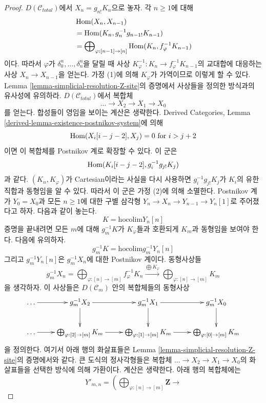 \begin{proof}
$D(\mathcal{C}_{total})$에서 $X_n = g_{n!}K_n$으로 놓자.
각 $n \geq 1$에 대해
$$
\begin{aligned}
&\mathop{\mathrm{Hom}}\nolimits(X_n, X_{n - 1})
\\
&=
\mathop{\mathrm{Hom}}\nolimits(K_n, g_n^{-1}g_{n - 1!}K_{n - 1})
\\
&=
\bigoplus\nolimits_{\varphi : [n - 1] \to [n]}
\mathop{\mathrm{Hom}}\nolimits(K_n, f_\varphi^{-1}K_{n - 1})
\end{aligned}
$$
이다. 따라서 $\varphi$가
$\delta^n_0, \ldots, \delta^n_n$을 달릴 때 사상
$K_\varphi^{-1} : K_n \to f_\varphi^{-1}K_{n - 1}$의
교대합에 대응하는 사상 $X_n \to X_{n - 1}$을 얻는다.
가정 (1)에 의해 $K_\varphi$가 가역이므로 이렇게 할 수 있다.
Lemma \ref{lemma-simplicial-resolution-Z-site}의 증명에서
사상들을 정의한 방식과의 유사성에 유의하라.
$D(\mathcal{C}_{total})$에서 복합체
$$
\ldots \to X_2 \to X_1 \to X_0
$$
를 얻는다. 합성들이 영임을 보이는 계산은 생략한다.
Derived Categories, Lemma
\ref{derived-lemma-existence-postnikov-system}에 의해
$$
\mathop{\mathrm{Hom}}\nolimits(X_i[i - j - 2], X_j) = 0\text{ for }i > j + 2
$$
이면 이 복합체를 Postnikov 계로 확장할 수 있다. 이 군은
$$
\mathop{\mathrm{Hom}}\nolimits(K_i[i - j - 2], g_i^{-1}g_{j!}K_j)
$$
과 같다. $(K_n, K_\varphi)$가 Cartesian이라는 사실을 다시 사용하면
$g_i^{-1}g_{j!}K_j$가 $K_i$의 유한 직합과 동형임을 알 수 있다.
따라서 이 군은 가정 (2)에 의해 소멸한다.
Postnikov 계가 $Y_0 = X_0$과 모든 $n \geq 1$에 대한
구별 삼각형 $Y_n \to X_n \to Y_{n - 1} \to Y_n[1]$로
주어졌다고 하자. 다음과 같이 놓는다.
$$
K = \text{hocolim} Y_n[n]
$$
증명을 끝내려면 모든 $m$에 대해 $g_m^{-1}K$가
$K_\varphi$들과 호환되게 $K_m$과 동형임을 보여야 한다.
다음에 유의하자.
$$
g_m^{-1} K = \text{hocolim} g_m^{-1}Y_n[n]
$$
그리고 $g_m^{-1}Y_n[n]$은 $g_m^{-1}X_n$에 대한 Postnikov 계이다.
동형사상들
$$
g_m^{-1}X_n =
\bigoplus\nolimits_{\varphi : [n] \to [m]} f_\varphi^{-1}K_n
\xrightarrow{\bigoplus K_\varphi}
\bigoplus\nolimits_{\varphi : [n] \to [m]} K_m
$$
을 생각하자. 이 사상들은 $D(\mathcal{C}_m)$ 안의 복합체들의 동형사상
$$
\xymatrix{
\ldots \ar[r] &
g_m^{-1}X_2 \ar[r] \ar[d] &
g_m^{-1}X_1 \ar[r] \ar[d] &
g_m^{-1}X_0 \ar[d] \\
\ldots \ar[r] &
\bigoplus\nolimits_{\varphi : [2] \to [m]} K_m \ar[r] &
\bigoplus\nolimits_{\varphi : [1] \to [m]} K_m \ar[r] &
\bigoplus\nolimits_{\varphi : [0] \to [m]} K_m
}
$$
을 정의한다. 여기서 아래 행의 화살표들은 Lemma
\ref{lemma-simplicial-resolution-Z-site}의 증명에서와 같다.
큰 도식의 정사각형들은 복합체
$\ldots \to X_2 \to X_1 \to X_0$의 화살표들을 선택한 방식에 의해
가환이다. 계산은 생략한다. 아래 행의 복합체에는
$$
Y'_{m, n} =
\left(\bigoplus\nolimits_{\varphi : [n] \to [m]} \mathbf{Z} \to
$$
\end{proof}
